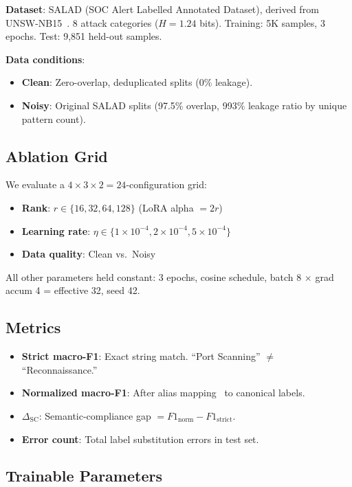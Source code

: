 \documentclass[journal]{IEEEtran}
\begin{document}
\textbf{Dataset}: SALAD (SOC Alert Labelled Annotated Dataset), derived from UNSW-NB15~\cite{moustafa2016}. 8 attack categories ($H = 1.24$ bits). Training: 5K samples, 3 epochs. Test: 9,851 held-out samples.

\textbf{Data conditions}:
\begin{itemize}
\item \textbf{Clean}: Zero-overlap, deduplicated splits (0\% leakage).
\item \textbf{Noisy}: Original SALAD splits (97.5\% overlap, 993\% leakage ratio by unique pattern count).
\end{itemize}

\subsection{Ablation Grid}
We evaluate a $4 \times 3 \times 2 = 24$-configuration grid:
\begin{itemize}
\item \textbf{Rank}: $r \in \{16, 32, 64, 128\}$ (LoRA alpha $= 2r$)
\item \textbf{Learning rate}: $\eta \in \{1\times10^{-4}, 2\times10^{-4}, 5\times10^{-4}\}$
\item \textbf{Data quality}: Clean vs.\ Noisy
\end{itemize}

All other parameters held constant: 3 epochs, cosine schedule, batch 8 $\times$ grad accum 4 = effective 32, seed 42.

\subsection{Metrics}
\begin{itemize}
\item \textbf{Strict macro-F1}: Exact string match. ``Port Scanning'' $\neq$ ``Reconnaissance.''
\item \textbf{Normalized macro-F1}: After alias mapping~\cite{p3} to canonical labels.
\item \textbf{$\Delta_\text{SC}$}: Semantic-compliance gap $= F1_\text{norm} - F1_\text{strict}$.
\item \textbf{Error count}: Total label substitution errors in test set.
\end{itemize}

\subsection{Trainable Parameters}
\end{document}
